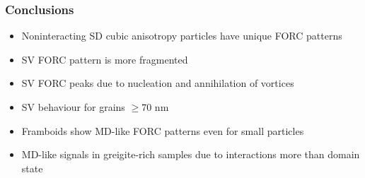\documentclass{beamer}
\begin{document}
		\begin{frame}
			\frametitle{Conclusions}
			\begin{itemize}
                          \item Noninteracting SD cubic anisotropy particles have \alert{unique FORC patterns}
                          \item SV FORC pattern is more \alert{fragmented}
                          \item SV FORC peaks due to \alert{nucleation and annihilation} of vortices
                          \item SV behaviour for \alert{grains $\geq$70 nm}
                          \item Framboids show \alert{MD-like FORC patterns} even for small particles
			  \item MD-like signals in greigite-rich samples due to \alert{interactions} more than domain state
			\end{itemize}
		\end{frame}

\end{document}

